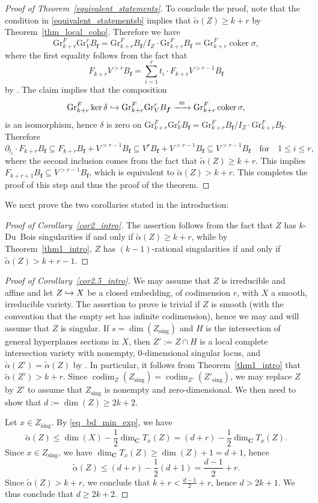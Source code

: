 \documentclass[11pt]{article}
\numberwithin{equation}{section}
\newcommand{\To}[1]{\mathchoice{\xrightarrow{\textstyle\kern4pt#1\kern3pt}}{\stackrel{#1}{\longrightarrow}}{}{}}
\newcommand\hto{\mathrel{\lhook\joinrel\to}}
\theoremstyle{plain}
\theoremstyle{definition}
\newcommand\C{{\mathbf C}}
\newcommand\bff{{\boldsymbol f}}
\newcommand\gr{\mathrm{Gr}}
\newcommand\sing{\mathrm{sing}}
\DeclareMathOperator{\codim}{codim}
\DeclareMathOperator{\coker}{coker}
\begin{document}
\begin{proof}[Proof of Theorem~\ref{equivalent_statements}]
To conclude the proof, note that the condition in \eqref{equivalent_statementsb} implies that $\widetilde\alpha(Z)\geq k+r$ by
Theorem~\ref{thm_local_coho}. Therefore we have
\[\gr^F_{k+r}\gr^r_VB_\bff=\gr^F_{k+r}B_\bff/I_Z\cdot \gr^F_{k+r}B_\bff=\gr^F_{k+r} \coker\sigma,\]
where the first equality follows from the fact that
\[F_{k+r}V^{>r}B_{\bff}=\sum_{i=1}^r t_i\cdot F_{k+r}V^{>r-1}B_{\bff}\]
by \cite[Th.\,1.1]{CD}.
The claim implies that the composition
\[
\gr^F_{k+r}\ker\delta\hto \gr^F_{k+r}\gr^r_VB_\bff \To{=} \gr^F_{k+r} \coker\sigma,
\]
is an isomorphism, hence
$\delta$ is zero on $\gr^F_{k+r}\gr^r_V B_\bff=\gr^F_{k+r} B_\bff/I_Z\cdot\gr^F_{k+r} B_\bff$. Therefore
\[\partial_{t_i}\cdot F_{k+r}B_{\bff}\subseteq F_{k+r}B_{\bff}+V^{>r-1}B_{\bff}\subseteq V^rB_{\bff}+V^{>r-1}B_{\bff}\subseteq V^{>r-1}B_{\bff}\quad \text{for}\quad 1\leq i\leq r,\]
where the second inclusion comes from the fact that $\widetilde{\alpha}(Z)\geq k+r$.
This implies $F_{k+r+1}B_{\bff}\subseteq V^{>r-1}B_{\bff}$, which is equivalent to $\widetilde{\alpha}(Z)>k+r$.
This completes the proof of this step and thus the proof of the theorem.
\end{proof}

We next prove the two corollaries stated in the introduction:

\begin{proof}[Proof of Corollary~\ref{cor2_intro}]
The assertion follows from the fact that $Z$ has $k$-Du~Bois singularities if and only if $\widetilde{\alpha}(Z)\geq k+r$,
while by Theorem~\ref{thm1_intro}, $Z$ has $(k-1)$-rational singularities if and only if $\widetilde{\alpha}(Z)>k+r-1$.
\end{proof}

\begin{proof}[Proof of Corollary~\ref{cor2.5_intro}]
We may assume that $Z$ is irreducible and affine and let $Z\hto X$ be a closed embedding, of codimension $r$, with $X$ a smooth,
irreducible variety. The assertion to prove is trivial if $Z$ is smooth (with the convention that the empty set has infinite codimension),
hence we may and will assume that $Z$ is singular. If $s=\dim(Z_\sing)$ and
$H$ is the intersection of general hyperplanes sections in $X$, then $Z':=Z\cap H$ is a local complete intersection variety
with nonempty, $0$-dimensional singular locus,
and $\widetilde{\alpha}(Z')=\widetilde{\alpha}(Z)$ by \cite[Th.\,1.2]{CDMO}. In particular, it follows from
Theorem~\ref{thm1_intro} that $\widetilde{\alpha}(Z')>k+r$.
Since $\codim_Z(Z_\sing)=\codim_{Z'}(Z'_\sing)$, we may
replace $Z$ by $Z'$ to assume that
$Z_\sing$ is nonempty and zero-dimensional. We then need to show that $d:=\dim(Z)\geq 2k+2$.

Let $x\in Z_\sing$. By \eqref{eq_bd_min_exp}, we have
\[
\widetilde{\alpha}(Z) \leq \dim(X)-\frac{1}{2}\dim_{\C}T_x(Z)=(d+r)-\frac{1}{2}\dim_{\C}T_x(Z).
\]
Since $x\in Z_\sing$, we have $\dim_{\C}T_x(Z) \geq \dim(Z)+1=d+1$, hence
\[
\widetilde \alpha(Z) \leq (d+r)-\frac{1}{2}(d+1)=\frac{d-1}{2}+r.
\]
Since $\widetilde\alpha(Z)> k+r$, we conclude that $k+r<\frac{d-1}{2}+r$, hence $d>2k+1$.
We thus conclude that $d\geq 2k+2$.
\end{proof}
\end{document}
